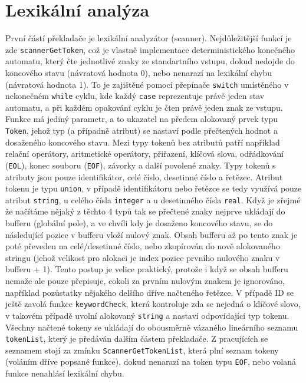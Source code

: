 \documentclass[a4paper, 12pt]{article}
\begin{document}
\newpage

\section{Lexikální analýza}
První částí překladače je lexikální analyzátor (scanner). Nejdůležitější funkcí je zde \verb|scannerGetToken|, což je vlastně implementace deterministického konečného automatu, který čte jednotlivé znaky ze standartního vstupu, dokud nedojde do koncového stavu (návratová hodnota 0), nebo nenarazí na lexikální chybu (návratová hodnota 1). To je zajištěné pomocí přepínače \verb|switch| umístěného v nekonečném \verb|while| cyklu, kde každý \verb|case| reprezentuje právě jeden stav automatu, a při každém opakování cyklu je čten právě jeden znak ze vstupu.
\newline
\newline
Funkce má jediný parametr, a to ukazatel na předem alokovaný prvek typu \verb|Token|, jehož typ (a případně atribut) se nastaví podle přečtených hodnot a dosaženého koncového stavu. Mezi typy tokenů bez atributů patří například relační operátory, aritmetické operátory, přiřazení, klíčová slova, odřádkování (\verb|EOL|), konec souboru (\verb|EOF|), závorky a další povolené znaky.
\newline
\newline
Typy tokenů s atributy jsou pouze identifikátor, celé číslo, desetinné číslo a řetězec. Atribut tokenu je typu \verb|union|, v případě identifikátoru nebo řetězce se tedy využívá pouze atribut \verb|string|, u celého čísla \verb|integer| a u desetinného čísla \verb|real|. Když je zřejmé že načítáme nějaký z těchto 4 typů tak se přečtené znaky nejprve ukládají do bufferu (globální pole), a ve chvíli kdy je dosaženo koncového stavu, se do následující pozice v bufferu vloží nulový znak. Obsah bufferu až po tento znak je poté převeden na celé/desetinné číslo, nebo zkopírován do nově alokovaného stringu (jehož velikost pro alokaci je index pozice prvního nulového znaku v bufferu + 1). Tento postup je velice praktický, protože i když se obsah bufferu nemaže ale pouze přepisuje, cokoli za prvním nulovým znakem je ignorováno, například pozůstatky nějakého delšího dříve načteného řetězce. V případě ID se ještě zavolá funkce \verb|keywordCheck|, která kontroluje zda se nejedná o klíčové slovo, v takovém případě uvolní alokovaný \verb|string| a nastaví odpovídající typ tokenu.
\newline
\newline
Všechny načtené tokeny se ukládají do obousměrně vázaného lineárního seznamu \verb|tokenList|, který je předáván dalším částem překladače. Z pracujících se seznamem stojí za zmínku \verb|ScannerGetTokenList|, která plní seznam tokeny (voláním dříve popsané funkce), dokud nenarazí na token typu \verb|EOF|, nebo volaná funkce nenahlásí lexikální chybu. 
\end{document}
